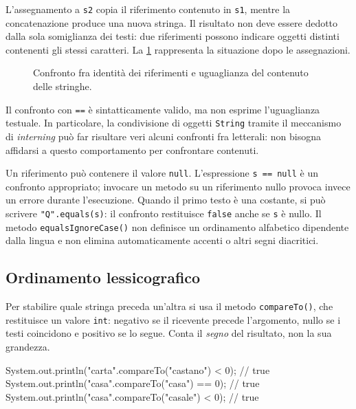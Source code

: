 L'assegnamento a \texttt{s2} copia il riferimento contenuto in
\texttt{s1}, mentre la concatenazione produce una nuova stringa.
Il risultato non deve essere dedotto dalla sola somiglianza dei testi:
due riferimenti possono indicare oggetti distinti contenenti gli stessi
caratteri. La \cref{fig:fi-java-cicli-stringhe-riferimenti} rappresenta
la situazione dopo le assegnazioni.

\begin{figure}[htbp]
  \centering
  
  \caption{Confronto fra identità dei riferimenti e uguaglianza del
  contenuto delle stringhe.}
  \label{fig:fi-java-cicli-stringhe-riferimenti}
\end{figure}

\begin{warning}[Confrontare stringhe con \texttt{==}]
Il confronto con \texttt{==} è sintatticamente valido, ma non esprime
l'uguaglianza testuale. In particolare, la condivisione di oggetti
\texttt{String} tramite il meccanismo di \emph{interning} può far
risultare veri alcuni confronti fra letterali: non bisogna affidarsi
a questo comportamento per confrontare contenuti.
\end{warning}

Un riferimento può contenere il valore \texttt{null}. L'espressione
\texttt{s == null} è un confronto appropriato; invocare
un metodo su un riferimento nullo provoca invece un errore
durante l'esecuzione. Quando il primo testo è una costante,
si può scrivere \texttt{"Q".equals(s)}: il confronto
restituisce \texttt{false} anche se \texttt{s} è nullo.
Il metodo \texttt{equalsIgnoreCase()} non definisce un ordinamento
alfabetico dipendente dalla lingua e non elimina automaticamente
accenti o altri segni diacritici.

\subsection{Ordinamento lessicografico}
\label{sec:fi-java-cicli-stringhe-ordine}

Per stabilire quale stringa preceda un'altra si usa il metodo
\texttt{compareTo()}, che restituisce un valore \texttt{int}:
negativo se il ricevente precede l'argomento, nullo se i testi
coincidono e positivo se lo segue. Conta il \emph{segno} del risultato,
non la sua grandezza.

\begin{unipdcode}[language=Java]
System.out.println("carta".compareTo("castano") < 0);  // true
System.out.println("casa".compareTo("casa") == 0);     // true
System.out.println("casa".compareTo("casale") < 0);    // true
\end{unipdcode}

